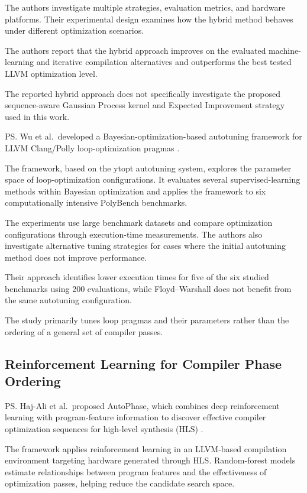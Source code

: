 The authors investigate multiple strategies, evaluation metrics, and hardware platforms. Their experimental design examines how the hybrid method behaves under different optimization scenarios.

\re{} The authors report that the hybrid approach improves on the evaluated machine-learning and iterative compilation alternatives and outperforms the best tested LLVM optimization level.

\rg{} The reported hybrid approach does not specifically investigate the proposed sequence-aware Gaussian Process kernel and Expected Improvement strategy used in this work.

\ps{} Wu et al.\ developed a Bayesian-optimization-based autotuning framework for LLVM Clang/Polly loop-optimization pragmas \cite{wu2022bayesian}.

\me{} The framework, based on the ytopt autotuning system, explores the parameter space of loop-optimization configurations. It evaluates several supervised-learning methods within Bayesian optimization and applies the framework to six computationally intensive PolyBench benchmarks.

The experiments use large benchmark datasets and compare optimization configurations through execution-time measurements. The authors also investigate alternative tuning strategies for cases where the initial autotuning method does not improve performance.

\re{} Their approach identifies lower execution times for five of the six studied benchmarks using 200 evaluations, while Floyd--Warshall does not benefit from the same autotuning configuration.

\rg{} The study primarily tunes loop pragmas and their parameters rather than the ordering of a general set of compiler passes.

\subsection{Reinforcement Learning for Compiler Phase Ordering}
\ps{} Haj-Ali et al.\ proposed AutoPhase, which combines deep reinforcement learning with program-feature information to discover effective compiler optimization sequences for high-level synthesis (HLS) \cite{hajali2020autophase}.

\me{} The framework applies reinforcement learning in an LLVM-based compilation environment targeting hardware generated through HLS. Random-forest models estimate relationships between program features and the effectiveness of optimization passes, helping reduce the candidate search space.

